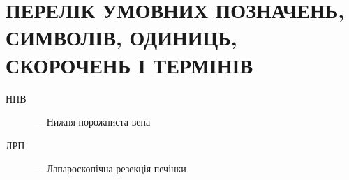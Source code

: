 \chapter{ПЕРЕЛІК УМОВНИХ ПОЗНАЧЕНЬ, СИМВОЛІВ, ОДИНИЦЬ, СКОРОЧЕНЬ І ТЕРМІНІВ}

\begin{description}
\item[НПВ] --- Нижня порожниста вена
\item[ЛРП] --- Лапароскопічна резекція печінки
\end{description}